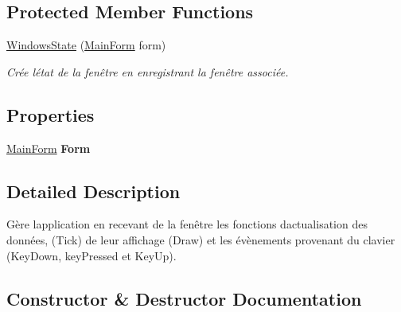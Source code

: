 \subsection*{Protected Member Functions}
\begin{DoxyCompactItemize}
\item 
\hyperlink{class_tentacle_slicers_1_1windows_1_1_windows_state_afefb5e108d3b404ccc019e209187b625}{Windows\+State} (\hyperlink{class_tentacle_slicers_1_1windows_1_1_main_form}{Main\+Form} form)
\begin{DoxyCompactList}\small\item\em Crée l\textquotesingle{}état de la fenêtre en enregistrant la fenêtre associée. \end{DoxyCompactList}\end{DoxyCompactItemize}
\subsection*{Properties}
\begin{DoxyCompactItemize}
\item 
\mbox{\label{class_tentacle_slicers_1_1windows_1_1_windows_state_a2f975398d0f8f204ceebc7a662127b89}} 
\hyperlink{class_tentacle_slicers_1_1windows_1_1_main_form}{Main\+Form} {\bfseries Form}
\end{DoxyCompactItemize}


\subsection{Detailed Description}
Gère l\textquotesingle{}application en recevant de la fenêtre les fonctions d\textquotesingle{}actualisation des données, (Tick) de leur affichage (Draw) et les évènements provenant du clavier (Key\+Down, key\+Pressed et Key\+Up). 



\subsection{Constructor \& Destructor Documentation}
\mbox{\label{class_tentacle_slicers_1_1windows_1_1_windows_state_afefb5e108d3b404ccc019e209187b625}} 
